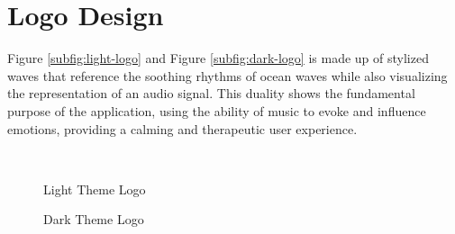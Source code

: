 \section{Logo Design}
Figure \ref{subfig:light-logo} and Figure \ref{subfig:dark-logo} is made up of stylized waves that reference the soothing rhythms of ocean waves while also visualizing the representation of an audio signal.
This duality shows the fundamental purpose of the application, using the ability of music to evoke and influence emotions, providing a calming and therapeutic user experience.
\begin{figure}[h!]
    \centering
    \qquad
    \vspace{0.5cm}
    \\
    \caption{Light Theme Logo}
\end{figure}
\begin{figure}[h!]
    \centering
    \caption{Dark Theme Logo}
\end{figure}
